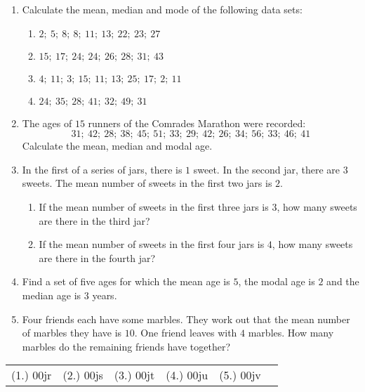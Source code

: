 \begin{exercises}{}{
    \begin{enumerate}[noitemsep, label=\textbf{\arabic*}.]
    \item Calculate the mean, median and mode of the following data sets:
      \begin{enumerate}[noitemsep, label=\textbf{(\alph*)} ]
      \item $2;~5;~8;~8;~11;~13;~22;~23;~27$
      \item $15;~17;~24;~24;~26;~28;~31;~43$
      \item $4;~11;~3;~15;~11;~13;~25;~17;~2;~11$
      \item $24;~35;~28;~41;~32;~49;~31$
      \end{enumerate}
    \item The ages of $15$ runners of the Comrades Marathon were recorded:
      \begin{equation*}
        31;~42;~28;~38;~45;~51;~33;~29;~42;~26;~34;~56;~33;~46;~41
      \end{equation*}
      Calculate the mean, median and modal age.
    \item In the first of a series of jars, there is $1$ sweet. In the
      second jar, there are $3$ sweets. The mean number of sweets in the
      first two jars is $2$.
      \begin{enumerate}[noitemsep, label=\textbf{(\alph*)} ]
      \item If the mean number of sweets in the first three jars is $3$, how
        many sweets are there in the third jar?
      \item If the mean number of sweets in the first four jars is $4$, how
        many sweets are there in the fourth jar?
      \end{enumerate}
    \item Find a set of five ages for which the mean age is $5$, the modal
      age is $2$ and the median age is $3$ years.
    \item Four friends each have some marbles. They work out that the mean
      number of marbles they have is $10$. One friend leaves with $4$
      marbles. How many marbles do the remaining friends have together?
    \end{enumerate}
\practiceinfo
\par 
\par \begin{tabular}[h]{cccccc}
(1.) 00jr&  (2.) 00js&  (3.) 00jt&  (4.) 00ju&  (5.) 00jv\end{tabular}
}
\end{exercises}

